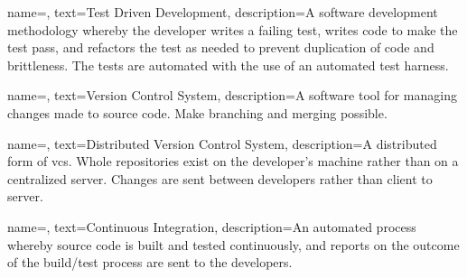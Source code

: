 {
name=,
text=Test Driven Development,
description={A software development methodology whereby the developer writes a failing test, writes code to make the test pass, and refactors the test as needed to prevent duplication of code and brittleness. The tests are automated with the use of an automated test harness.}
}

\newacronym[description={\glslink{tdd}{Test Driven Development}]{TDD}{TDD}{Test Driven Development}

{
name=,
text=Version Control System,
description={A software tool for managing changes made to source code. Make \gls{branching} and \gls{merging} possible.}
}

\newacronym[description={\glslink{vcs}{Version Control System}]{VCS}{VCS}{Version Control System}

{
name=,
text=Distributed Version Control System,
description={A distributed form of \gls{vcs}. Whole repositories exist on the developer's machine rather than on a centralized server. Changes are sent between developers rather than client to server.}
}

\newacronym[description={\glslink{dvcs}{Distributed Version Control System}]{DVCS}{DVCS}{Distributed Version Control System}

{
name=,
text=Continuous Integration,
description={An automated process whereby source code is built and tested continuously, and reports on the outcome of the build/test process are sent to the developers.}
}

\newacronym[description={\glslink{vcs}{Continuous Integration}]{CI}{CI}{Continuous Integration}